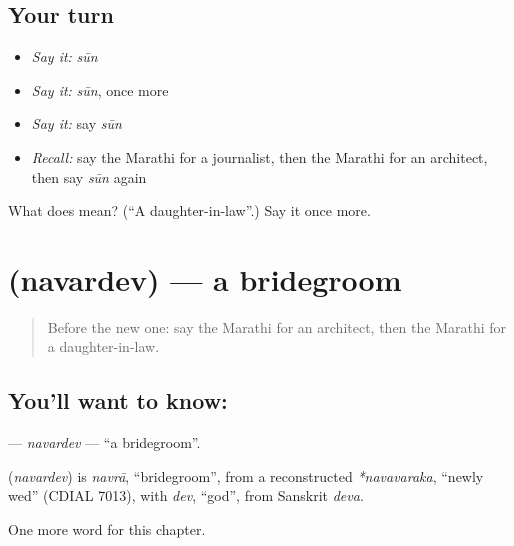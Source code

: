 \subsection*{Your turn}
\begin{itemize}
\raggedright
  \item \emph{Say it:} \emph{sūn}
  \item \emph{Say it:} \emph{sūn}, once more
  \item \emph{Say it:} say \emph{sūn}
  \item \emph{Recall:} say the Marathi for a journalist, then the Marathi for an architect, then say \emph{sūn} again
\end{itemize}

\begin{tcolorbox}[breakable,colback=teal!4,colframe=teal!35!black,title={Before you move on}]
What does  mean? (\textquotedblleft{}A daughter-in-law\textquotedblright{}.) Say it once more.
\end{tcolorbox}
\section[\texorpdfstring{\mr{नवरदेव} (navardev)}{नवरदेव (navardev)}]{ (navardev) — a bridegroom}

\label{lesson:MR-C181-navardev}



\begin{quote}
Before the new one: say the Marathi for an architect, then the Marathi for a daughter-in-law.
\end{quote}

\subsection*{You'll want to know: }
\textbf{} — \emph{navardev} — \textquotedblleft{}a bridegroom\textquotedblright{}.

\begin{cousinweb}
\textbf{} (\emph{navardev}) is \emph{navrā}, \textquotedblleft{}bridegroom\textquotedblright{}, from a reconstructed \emph{*navavaraka}, \textquotedblleft{}newly wed\textquotedblright{} (CDIAL 7013), with \emph{dev}, \textquotedblleft{}god\textquotedblright{}, from Sanskrit \emph{deva}.
\end{cousinweb}

\begin{grammarlens}[title={What you've built}]
One more word for this chapter.
\end{grammarlens}

